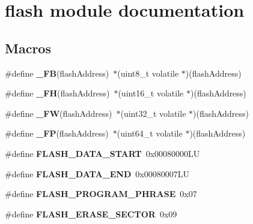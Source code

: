 \hypertarget{group__flash__module}{}\section{flash module documentation}
\label{group__flash__module}
\subsection*{Macros}
\begin{DoxyCompactItemize}
\item 
\hypertarget{group__flash__module_gac450fb89f016956f685a1e541644b2a8}{}\#define {\bfseries \+\_\+\+F\+B}(flash\+Address)~$\ast$(uint8\+\_\+t  volatile $\ast$)(flash\+Address)\label{group__flash__module_gac450fb89f016956f685a1e541644b2a8}

\item 
\hypertarget{group__flash__module_ga28550847e9609b9b396a4230f36884e9}{}\#define {\bfseries \+\_\+\+F\+H}(flash\+Address)~$\ast$(uint16\+\_\+t volatile $\ast$)(flash\+Address)\label{group__flash__module_ga28550847e9609b9b396a4230f36884e9}

\item 
\hypertarget{group__flash__module_gad4fb772b3db9c8eecdbf9df472351a28}{}\#define {\bfseries \+\_\+\+F\+W}(flash\+Address)~$\ast$(uint32\+\_\+t volatile $\ast$)(flash\+Address)\label{group__flash__module_gad4fb772b3db9c8eecdbf9df472351a28}

\item 
\hypertarget{group__flash__module_ga4c1198da68f5da4f6ffd5abc1d1c052a}{}\#define {\bfseries \+\_\+\+F\+P}(flash\+Address)~$\ast$(uint64\+\_\+t volatile $\ast$)(flash\+Address)\label{group__flash__module_ga4c1198da68f5da4f6ffd5abc1d1c052a}

\item 
\hypertarget{group__flash__module_ga5c70db9dac9dbc146f98a1e27c731dec}{}\#define {\bfseries F\+L\+A\+S\+H\+\_\+\+D\+A\+T\+A\+\_\+\+S\+T\+A\+R\+T}~0x00080000\+L\+U\label{group__flash__module_ga5c70db9dac9dbc146f98a1e27c731dec}

\item 
\hypertarget{group__flash__module_ga4d7e8c8d5e35c4743dbdcbe09e9d0797}{}\#define {\bfseries F\+L\+A\+S\+H\+\_\+\+D\+A\+T\+A\+\_\+\+E\+N\+D}~0x00080007\+L\+U\label{group__flash__module_ga4d7e8c8d5e35c4743dbdcbe09e9d0797}

\item 
\hypertarget{group__flash__module_ga55f968f8e0ca0a0be46b57c874cd2046}{}\#define {\bfseries F\+L\+A\+S\+H\+\_\+\+P\+R\+O\+G\+R\+A\+M\+\_\+\+P\+H\+R\+A\+S\+E}~0x07\label{group__flash__module_ga55f968f8e0ca0a0be46b57c874cd2046}

\item 
\hypertarget{group__flash__module_gae8cff498195805effa65b8dd715fe435}{}\#define {\bfseries F\+L\+A\+S\+H\+\_\+\+E\+R\+A\+S\+E\+\_\+\+S\+E\+C\+T\+O\+R}~0x09\label{group__flash__module_gae8cff498195805effa65b8dd715fe435}

\end{DoxyCompactItemize}
